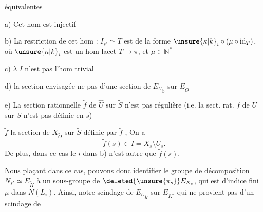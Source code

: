 équivalentes

a) Cet hom est injectif

b) La restriction de cet hom : $I_{s'}\simeq T$ est
de la forme $\unsure{\kappa|k}_i\circ(\mu\circ\operatorname{id}_T)$, où $\unsure{\kappa|k}_i$ est un
hom lacet $T\longrightarrow\pi$, et $\mu\in\mathbb N^{*}$

c) $\lambda\vert I$ n'est pas l'hom trivial

d) la section envisagée  ne  pas
d'une section de $E_{U_{\widetilde O}}$ sur $E_{\widetilde O}$

e) La section rationnelle  $\widetilde f$ de $\widehat U$ sur
$\widetilde S$ n'est pas régulière (i.e. la sect. rat.
$f$ de $U$ sur $S$ n'est pas définie en $s$)

  $\widetilde f$  la section de $X_{\widetilde O}$ sur $\widetilde S$
définie par $\widetilde f$ ,
 On a
\[
\widetilde f(s)\in I=X_s\setminus U_s.
\]
De plus, dans ce cas le $i$ dans b) n'est
autre que $\widetilde f(s)$.

Nous plaçant dans ce cas, \uline{ pouvons donc
identifier le groupe de décomposition} $N_{s'}\simeq E_{\widetilde K}$
à un sous-groupe de $\deleted{\unsure{\pi_s}}E_{X_s}$,  qui est
d'indice fini $\mu$ dans  $N(L_i)$. Ainsi,
notre scindage  de $E_{U_{\widetilde K}}$  sur $E_{\widetilde K}$,
qui ne provient pas d'un scindage de
